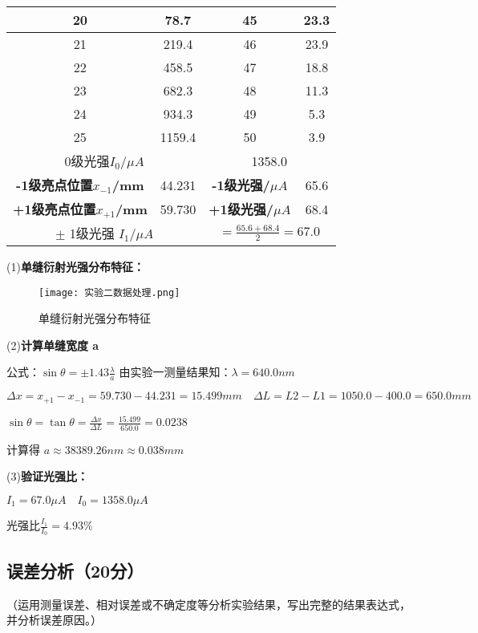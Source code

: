 \documentclass[]{../模板/Report}%
\begin{document}
\begin{fullreportonly}
\begin{table}[H]
\begin{tabular}{|c|c|c|c|}
        \hline
        20 & 78.7 & 45 & 23.3  \\
        \hline 
        21 & 219.4 & 46 & 23.9  \\
        \hline
        22 & 458.5 & 47 & 18.8  \\
        \hline
        23 & 682.3 & 48 & 11.3  \\
        \hline
        24 & 934.3 & 49 & 5.3  \\
        \hline
        25 & 1159.4 & 50 & 3.9  \\
        \hline
        \multicolumn{2}{|c|}{0级光强$I_0/\mu A$} &
        \multicolumn{2}{|c|}{1358.0}  \\
        \hline
        \textbf{-1级亮点位置$x_{-1}$/mm} & 44.231 & \textbf{-1级光强/$\mu A$} & 65.6  \\
        \hline
        \textbf{+1级亮点位置$x_{+1}$/mm} & 59.730 & \textbf{+1级光强/$\mu A$} & 68.4  \\
        \hline
        \multicolumn{2}{|c|}{$\pm$ 1级光强 $I_1/\mu A$} &
        \multicolumn{2}{|c|}{ $= \frac{65.6 + 68.4}{2} = 67.0$}  \\
        \hline
    \end{tabular}
\end{table}

(1)\textbf{单缝衍射光强分布特征：}
\begin{figure}[H]
    \centering
    \texttt{[image: 实验二数据处理.png]}
    \caption{单缝衍射光强分布特征}
\end{figure}

(2)\textbf{计算单缝宽度 a}
\par
公式：$\sin \theta = \pm 1.43 \frac{\lambda}{a}$ 由实验一测量结果知：$\lambda = 640.0nm$
\par
$\Delta x = x_{+1} - x_{-1} = 59.730 - 44.231 = 15.499mm \quad \Delta L = L2 - L1 = 1050.0 - 400.0 = 650.0mm$
\par
$\sin \theta = \tan \theta = \frac{\Delta x}{\Delta L} = \frac{15.499}{650.0} = 0.0238$
\par
计算得 $a \approx 38389.26nm \approx 0.038mm$
\par
\vspace{0.5cm}
(3)\textbf{验证光强比：}
\par
$I_1 = 67.0\mu A \quad I_0 = 1358.0\mu A$
\par
光强比$\frac{I_1}{I_0} = 4.93\%$



\subsection{误差分析（20分）}
（运用测量误差、相对误差或不确定度等分析实验结果，写出完整的结果表达式，并分析误差原因。）

\end{fullreportonly}
\end{document}
